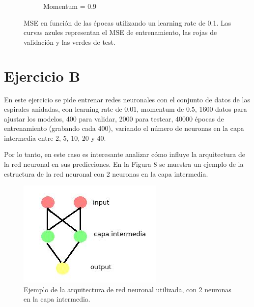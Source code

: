 \documentclass[12pt, a4paper]{article}
\begin{document}
\begin{figure}
\begin{subfigure}[b]{0.45\textwidth}
        \caption{Momentum = 0.9}
    \end{subfigure}

    \caption{MSE en función de las épocas utilizando un learning rate de 0.1. Las curvas azules representan el MSE de entrenamiento, las rojas de validación y las verdes de test.}
\end{figure}
 

\section*{Ejercicio B}

En este ejercicio se pide entrenar redes neuronales con el conjunto de datos de las espirales anidadas, con learning rate de 0.01, momentum de 0.5, 1600 datos para ajustar los modelos, 400 para validar, 2000 para testear, 40000 épocas de entrenamiento (grabando cada 400), variando el número de neuronas en la capa intermedia entre 2, 5, 10, 20 y 40. 

\bigskip
 
Por lo tanto, en este caso es interesante analizar cómo influye la arquitectura de la red neuronal en sus predicciones. En la Figura 8 se muestra un ejemplo de la estructura de la red neuronal con 2 neuronas en la capa intermedia. 
 

 
\begin{figure}
    \centering
	\includegraphics[scale=0.65]{neurona}
	\caption{Ejemplo de la arquitectura de red neuronal utilizada, con 2 neuronas en la capa intermedia.}
\end{figure} 
 
\bigskip  
 
\end{document}
